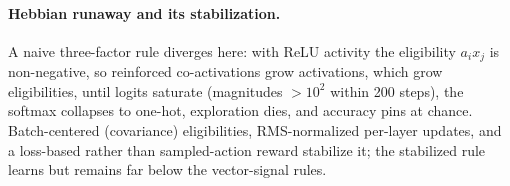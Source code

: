 \documentclass[11pt]{article}
\begin{document}
\paragraph{Hebbian runaway and its stabilization.} A naive three-factor rule
diverges here: with ReLU activity the eligibility $a_i x_j$ is non-negative,
so reinforced co-activations grow activations, which grow eligibilities,
until logits saturate (magnitudes ${>}10^2$ within 200 steps), the softmax
collapses to one-hot, exploration dies, and accuracy pins at chance.
Batch-centered (covariance) eligibilities, RMS-normalized per-layer updates,
and a loss-based rather than sampled-action reward stabilize it; the
stabilized rule learns but remains far below the vector-signal rules.
\end{document}
